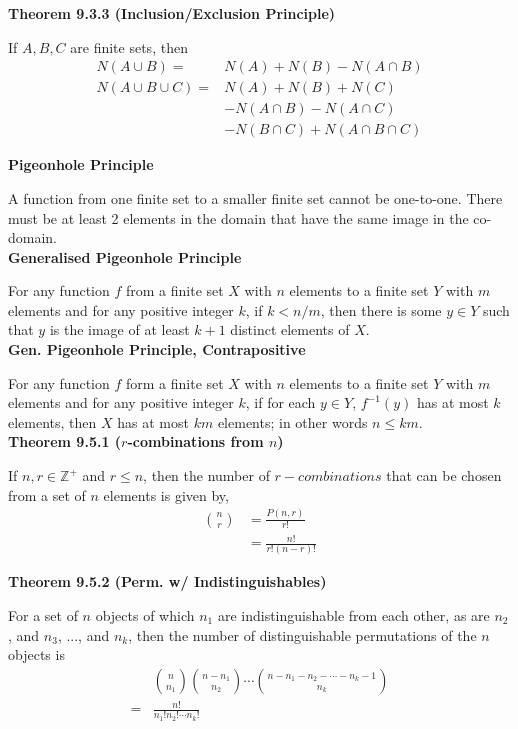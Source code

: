 \documentclass[a4paper]{article}
\newcommand{\subheading}[1]{{\scriptsize\textbf{#1}}}
\begin{document}
\begin{multicols*}{4}
\subheading{Theorem 9.3.3 (Inclusion/Exclusion Principle)}

If $A, B, C$ are finite sets, then
\begin{align*}
  N(A \cup B) = &N(A) + N(B) - N(A \cap B) \\
  N(A \cup B \cup C) = &N(A) + N(B) + N(C) \\
    &-N(A \cap B) - N(A \cap C)\\
    &- N(B \cap C)+ N(A \cap B \cap C)
\end{align*}

\subheading{Pigeonhole Principle}

A function from one finite set to a smaller finite set cannot be one-to-one.
There must be at least 2 elements in the domain that have the same image in the
co-domain.\\

\subheading{Generalised Pigeonhole Principle}

For any function $f$ from a finite set $X$ with $n$ elements to a finite set $Y$
with $m$ elements and for any positive integer $k$, if $k < n/m$, then there is
some $y \in Y$ such that $y$ is the image of at least $k + 1$ distinct elements
of $X$.\\

\subheading{Gen. Pigeonhole Principle, Contrapositive}

For any function $f$ form a finite set $X$ with $n$ elements to a finite set $Y$
with $m$ elements and for any positive integer $k$, if for each $y \in Y$,
$f^{-1}(y)$ has at most $k$ elements, then $X$ has at most $km$ elements; in
other words $n \leq km$.\\

\subheading{Theorem 9.5.1 ($r$-combinations from $n$)}

If $n, r \in \mathbb{Z}^+$ and $r \leq n$, then the number of $r-combinations$
that can be chosen from a set of $n$ elements is given by,
\begin{align*}
  \binom{n}{r} &= \frac{P(n, r)}{r!} \\
    &= \frac{n!}{r!(n-r)!}
\end{align*}

\subheading{Theorem 9.5.2 (Perm. w/ Indistinguishables)}

For a set of $n$ objects of which $n_1$ are indistinguishable from each other,
as are $n_2$, and $n_3$, ..., and $n_k$, then the number of distinguishable
permutations of the $n$ objects is
\begin{align*}
  &\binom{n}{n_1} \binom{n-n_1}{n_2} \cdots \binom{n-n_1-n_2- \cdots - n_k-1}{n_k} \\
  = &\frac{n!}{n_1!n_2!\cdots n_k!}
\end{align*}


\end{multicols*}
\end{document}
